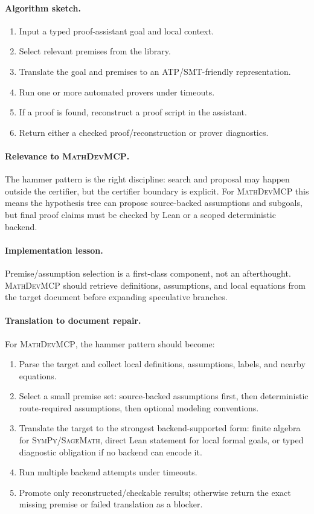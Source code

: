 \documentclass[11pt]{article}
\newcommand{\MathDevMCP}{\textsc{MathDevMCP}}
\newcommand{\Sage}{\textsc{SageMath}}
\newcommand{\SymPy}{\textsc{SymPy}}
\begin{document}
\paragraph{Algorithm sketch.}

\begin{enumerate}[leftmargin=*]
\item Input a typed proof-assistant goal and local context.
\item Select relevant premises from the library.
\item Translate the goal and premises to an ATP/SMT-friendly representation.
\item Run one or more automated provers under timeouts.
\item If a proof is found, reconstruct a proof script in the assistant.
\item Return either a checked proof/reconstruction or prover diagnostics.
\end{enumerate}

\paragraph{Relevance to \MathDevMCP.}
The hammer pattern is the right discipline: search and proposal may happen
outside the certifier, but the certifier boundary is explicit. For
\MathDevMCP{} this means the hypothesis tree can propose source-backed
assumptions and subgoals, but final proof claims must be checked by Lean or a
scoped deterministic backend.

\paragraph{Implementation lesson.}
Premise/assumption selection is a first-class component, not an afterthought.
\MathDevMCP{} should retrieve definitions, assumptions, and local equations
from the target document before expanding speculative branches.

\paragraph{Translation to document repair.}
For \MathDevMCP{}, the hammer pattern should become:

\begin{enumerate}[leftmargin=*]
\item Parse the target and collect local definitions, assumptions, labels, and
  nearby equations.
\item Select a small premise set: source-backed assumptions first, then
  deterministic route-required assumptions, then optional modeling conventions.
\item Translate the target to the strongest backend-supported form: finite
  algebra for \SymPy/\Sage{}, direct Lean statement for local formal goals, or
  typed diagnostic obligation if no backend can encode it.
\item Run multiple backend attempts under timeouts.
\item Promote only reconstructed/checkable results; otherwise return the
  exact missing premise or failed translation as a blocker.
\end{enumerate}
\end{document}
